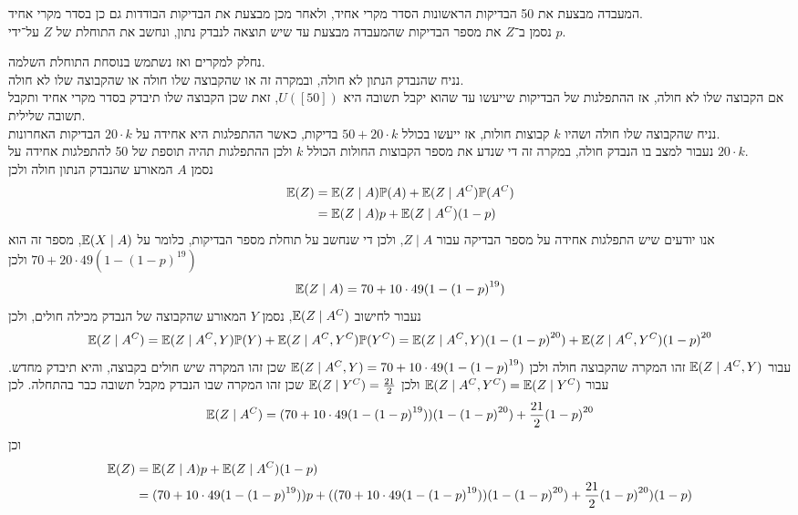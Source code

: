 \subquestion{}
המעבדה מבצעת את 50 הבדיקות הראשונות הסדר מקרי אחיד, ולאחר מכן מבצעת את הבדיקות הבודדות גם כן בסדר מקרי אחיד. \\
נסמן ב־$Z$ את מספר הבדיקות שהמעבדה מבצעת עד שיש תוצאה לנבדק נתון, ונחשב את התוחלת של $Z$ על־ידי $p$.
\begin{solution}
	נחלק למקרים ואז נשתמש בנוסחת התוחלת השלמה. \\
	נניח שהנבדק הנתון לא חולה, ובמקרה זה או שהקבוצה שלו חולה או שהקבוצה שלו לא חולה. \\
	אם הקבוצה שלו לא חולה, אז ההתפלגות של הבדיקות שייעשו עד שהוא יקבל תשובה היא $U([50])$, זאת שכן הקבוצה שלו תיבדק בסדר מקרי אחיד ותקבל תשובה שלילית. \\
	נניח שהקבוצה שלו חולה ושהיו $k$ קבוצות חולות, אז ייעשו בכולל $50 + 20 \cdot k$ בדיקות, כאשר ההתפלגות היא אחידה על $20 \cdot k$ הבדיקות האחרונות. \\
	נעבור למצב בו הנבדק חולה, במקרה זה די שנדע את מספר הקבוצות החולות הכולל $k$ ולכן ההתפלגות תהיה תוספת של 50 להתפלגות אחידה על $20 \cdot k$. \\
	נסמן $A$ המאורע שהנבדק הנתון חולה ולכן
	\begin{align*}
		\mathbb{E}(Z)
		& = \mathbb{E}(Z \mid A) \mathbb{P}(A) + \mathbb{E}(Z \mid A^C) \mathbb{P}(A^C) \\
		& = \mathbb{E}(Z \mid A) p + \mathbb{E}(Z \mid A^C) (1 - p)
	\end{align*}
	אנו יודעים שיש התפלגות אחידה על מספר הבדיקה עבור $Z \mid A$, ולכן די שנחשב על תוחלת מספר הבדיקות, כלומר על $\mathbb{E}(X \mid A)$, מספר זה הוא $70 + 20 \cdot 49 (1 - {(1 - p)}^{19})$ ולכן
	\[
		\mathbb{E}(Z \mid A)
		= 70 + 10 \cdot 49 (1 - {(1 - p)}^{19})
	\]
	נעבור לחישוב $\mathbb{E}(Z \mid A^C)$, נסמן $Y$ המאורע שהקבוצה של הנבדק מכילה חולים, ולכן
	\[
		\mathbb{E}(Z \mid A^C)
		= \mathbb{E}(Z \mid A^C, Y) \mathbb{P}(Y) + \mathbb{E}(Z \mid A^C, Y^C) \mathbb{P}(Y^C)
		= \mathbb{E}(Z \mid A^C, Y) (1 - {(1 - p)}^{20}) + \mathbb{E}(Z \mid A^C, Y^C) {(1 - p)}^{20}
	\]
	עבור $\mathbb{E}(Z \mid A^C, Y)$ זהו המקרה שהקבוצה חולה ולכן $\mathbb{E}(Z \mid A^C, Y) = 70 + 10 \cdot 49 (1 - {(1 - p)}^{19})$ שכן זהו המקרה שיש חולים בקבוצה, והיא תיבדק מחדש.
	עבור $\mathbb{E}(Z \mid A^C, Y^C) = \mathbb{E}(Z \mid Y^C)$ ולכן $\mathbb{E}(Z \mid Y^C) = \frac{21}{2}$ שכן זהו המקרה שבו הנבדק מקבל תשובה כבר בהתחלה.
	לכן
	\[
		\mathbb{E}(Z \mid A^C)
		= (70 + 10 \cdot 49 (1 - {(1 - p)}^{19})) (1 - {(1 - p)}^{20}) + \frac{21}{2} {(1 - p)}^{20}
	\]
	וכן
	\begin{align*}
		\mathbb{E}(Z)
		& = \mathbb{E}(Z \mid A) p + \mathbb{E}(Z \mid A^C) (1 - p) \\
		& = (70 + 10 \cdot 49 (1 - {(1 - p)}^{19})) p + ((70 + 10 \cdot 49 (1 - {(1 - p)}^{19})) (1 - {(1 - p)}^{20}) + \frac{21}{2} {(1 - p)}^{20}
) (1 - p)
	\end{align*}
\end{solution}

